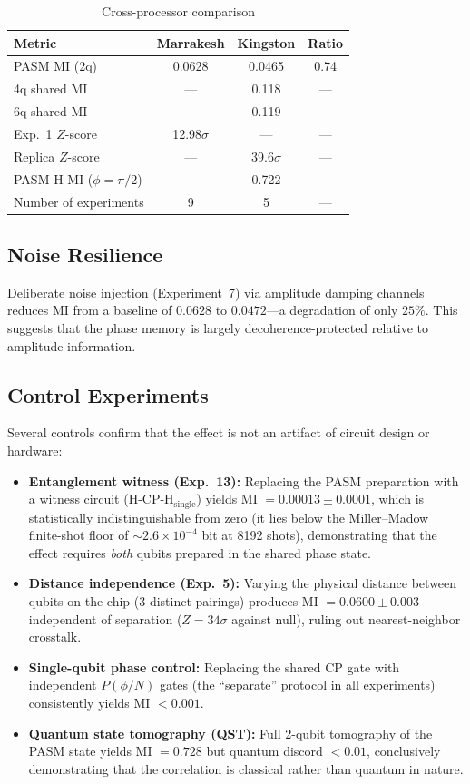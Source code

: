\documentclass[12pt,a4paper]{article}
\begin{document}
\begin{table}[ht]
\centering
\caption{Cross-processor comparison}
\label{tab:cross}
\begin{tabular}{lccc}
\toprule
Metric & Marrakesh & Kingston & Ratio \\
\midrule
PASM MI (2q) & 0.0628 & 0.0465 & 0.74 \\
4q shared MI & --- & 0.118 & --- \\
6q shared MI & --- & 0.119 & --- \\
Exp.~1 $Z$-score & 12.98$\sigma$ & --- & --- \\
Replica $Z$-score & --- & 39.6$\sigma$ & --- \\
PASM-H MI ($\phi=\pi/2$) & --- & 0.722 & --- \\
Number of experiments & 9 & 5 & --- \\
\bottomrule
\end{tabular}
\end{table}

\subsection{Noise Resilience}

Deliberate noise injection (Experiment~7) via amplitude damping channels reduces MI from a baseline of $0.0628$ to $0.0472$---a degradation of only $25\%$. This suggests that the phase memory is largely decoherence-protected relative to amplitude information.

\subsection{Control Experiments}

Several controls confirm that the effect is not an artifact of circuit design or hardware:

\begin{itemize}
\item \textbf{Entanglement witness (Exp.~13):} Replacing the PASM preparation with a witness circuit (H-CP-H$_{\text{single}}$) yields MI $= 0.00013 \pm 0.0001$, which is statistically indistinguishable from zero (it lies below the Miller--Madow finite-shot floor of $\sim 2.6\times10^{-4}$ bit at 8192 shots), demonstrating that the effect requires \textit{both} qubits prepared in the shared phase state.
\item \textbf{Distance independence (Exp.~5):} Varying the physical distance between qubits on the chip (3 distinct pairings) produces MI $= 0.0600 \pm 0.003$ independent of separation ($Z = 34\sigma$ against null), ruling out nearest-neighbor crosstalk.
\item \textbf{Single-qubit phase control:} Replacing the shared CP gate with independent $P(\phi/N)$ gates (the ``separate'' protocol in all experiments) consistently yields MI $< 0.001$.
\item \textbf{Quantum state tomography (QST):} Full 2-qubit tomography of the PASM state yields MI $= 0.728$ but quantum discord $< 0.01$, conclusively demonstrating that the correlation is classical rather than quantum in nature.
\end{itemize}
\end{document}
